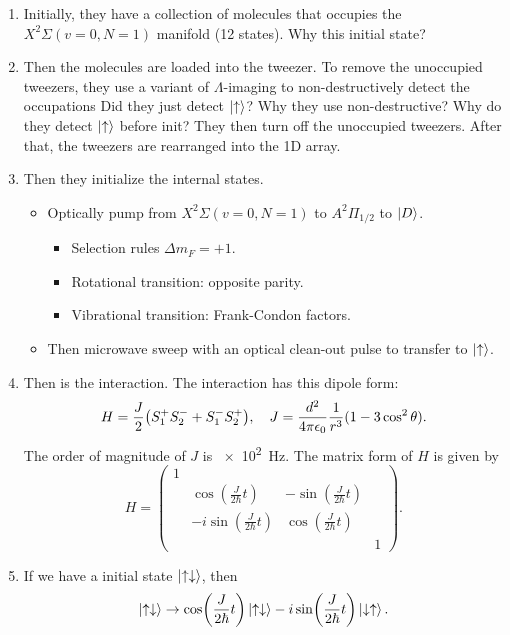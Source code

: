 \documentclass{article}
\begin{document}
\begin{enumerate}
    \item Initially, they have a collection of  molecules that occupies the $X^2\Sigma(v=0,N=1)$ manifold (12 states). {\color{red} Why this initial state?}
    \item Then the molecules are loaded into the tweezer.
    To remove the unoccupied tweezers, they use a variant of $\Lambda$-imaging to non-destructively detect the occupations {\color{red} Did they just detect $\ket{\uparrow}$? Why they use non-destructive? Why do they detect $\ket{\uparrow}$ before init?}
    They then turn off the unoccupied tweezers.
    After that, the tweezers are rearranged into the 1D array.
    \item Then they initialize the internal states.
    \begin{itemize}
        \item Optically pump from $X^2\Sigma(v=0,N=1)$ to $A^2\Pi_{1/2}$ to $\ket{D}$.
        \begin{itemize}
            \item Selection rules $\Delta m_F = +1$.
            \item Rotational transition: opposite parity.
            \item Vibrational transition: Frank-Condon factors.
        \end{itemize}
        \item Then microwave sweep with an optical clean-out pulse to transfer to $\ket{\uparrow}$.
    \end{itemize}
    \item Then is the interaction.
    The interaction has this dipole form:
    \[ H = \frac{J}{2}\qty(S^+_1 S^-_2 + S^-_1 S^+_2),\quad  J = \frac{d^2}{4\pi \epsilon_0} \frac{1}{r^3}(1-3\cos^2\theta). \]
    The order of magnitude of $J$ is \SI{e2}{\hertz}.
    The matrix form of $H$ is given by
    \[ H = \begin{pmatrix}
        1 & & & \\
        & \cos (\frac{J}{2\hbar}t) & -\sin (\frac{J}{2\hbar}t) & \\
        & -i\sin(\frac{J}{2\hbar}t) & \cos(\frac{J}{2\hbar}t) & \\
        & & & 1
    \end{pmatrix}. \]
    \item If we have a initial state $\ket{\uparrow\downarrow}$, then
    \[ \ket{\uparrow\downarrow} \rightarrow \cos(\frac{J}{2\hbar}t)\ket{\uparrow\downarrow} - i\sin(\frac{J}{2\hbar}t)\ket{\downarrow\uparrow}. \]

\end{enumerate}
\end{document}
